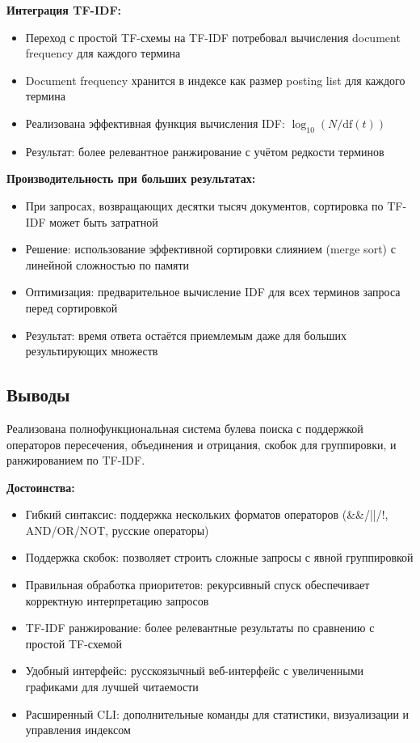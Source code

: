 \textbf{Интеграция TF-IDF:}
\begin{itemize}
    \item Переход с простой TF-схемы на TF-IDF потребовал вычисления document frequency для каждого термина
    \item Document frequency хранится в индексе как размер posting list для каждого термина
    \item Реализована эффективная функция вычисления IDF: $\log_{10}(N / \text{df}(t))$
    \item Результат: более релевантное ранжирование с учётом редкости терминов
\end{itemize}

\textbf{Производительность при больших результатах:}
\begin{itemize}
    \item При запросах, возвращающих десятки тысяч документов, сортировка по TF-IDF может быть затратной
    \item Решение: использование эффективной сортировки слиянием (merge sort) с линейной сложностью по памяти
    \item Оптимизация: предварительное вычисление IDF для всех терминов запроса перед сортировкой
    \item Результат: время ответа остаётся приемлемым даже для больших результирующих множеств
\end{itemize}

\subsection{Выводы}

Реализована полнофункциональная система булева поиска с поддержкой операторов пересечения, объединения и отрицания, скобок для группировки, и ранжированием по TF-IDF.

\textbf{Достоинства:}
\begin{itemize}
    \item Гибкий синтаксис: поддержка нескольких форматов операторов (\&\&/||/!, AND/OR/NOT, русские операторы)
    \item Поддержка скобок: позволяет строить сложные запросы с явной группировкой
    \item Правильная обработка приоритетов: рекурсивный спуск обеспечивает корректную интерпретацию запросов
    \item TF-IDF ранжирование: более релевантные результаты по сравнению с простой TF-схемой
    \item Удобный интерфейс: русскоязычный веб-интерфейс с увеличенными графиками для лучшей читаемости
    \item Расширенный CLI: дополнительные команды для статистики, визуализации и управления индексом
\end{itemize}


